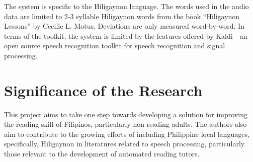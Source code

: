 The system is specific to the Hiligaynon language. The words used in the audio data are limited to 2-3 syllable Hiligaynon words from the book “Hiligaynon Lessons” by Cecille L. Motus. Deviations are only measured word-by-word. In terms of the toolkit, the system is limited by the features offered by Kaldi - an open source speech recognition toolkit for speech recognition and signal processing.

\section{Significance of the Research}
\label{sec:significance}

This project aims to take one step towards developing a solution for improving the reading skill of Filipinos, particularly non reading adults. The authors also aim to contribute to the growing efforts of including Philippine local languages, specifically, Hiligaynon in literatures related to speech processing, particularly those relevant to the development of automated reading tutors.
